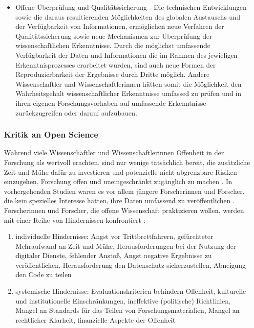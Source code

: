 \begin{itemize}
\item Offene Überprüfung und Qualitätssicherung - Die technischen Entwicklungen sowie die daraus resultierenden Möglichkeiten des globalen Austauschs und der Verfügbarkeit von Informationen, ermöglichen neue Verfahren der Qualitätssicherung sowie neue Mechanismen zur Überprüfung der wissenschaftlichen Erkenntnisse. Durch die möglichst umfassende Verfügbarkeit der Daten und Informationen die im Rahmen des jewieligen Erkenntnisprozesses erarbeitet wurden, sind auch neue Formen der Reproduzierbarkeit der Ergebnisse durch Dritte möglich. Andere Wissenschaftler und Wissenschaftlerinnen hätten somit die Möglichkeit den Wahrheitsgehalt wissenschaftlicher Erkenntnisse umfassed zu prüfen und in ihren eigenen Forschungsvorhaben auf umfassende Erkenntnisse zurückzugreifen oder darauf aufzubauen.
\end{itemize}

\subsubsection{Kritik an Open Science}

Während viele Wissenschaftler und Wissenschaftlerinnen Offenheit in der Forschung als wertvoll erachten, sind nur wenige tatsächlich bereit, die zusätzliche Zeit und Mühe dafür zu investieren und potenzielle nicht abgrenzbare Risiken einzugehen, Forschung offen und uneingeschränkt zugänglich zu machen \cite{Scheliga_2014} \cite{Tenopir_2011} \cite{Procter_2010}. In vorhergehenden Studien waren es vor allem jüngere Forscherinnen und Forscher, die kein spezielles Interesse hatten, ihre Daten umfassend zu veröffentlichen \cite{Tenopir_2011}. Forscherinnen und Forscher, die offene Wissenschaft praktizieren wollen, werden mit einer Reihe von Hindernissen konfrontiert \cite{Scheliga_2014}:
\begin{enumerate}
\item individuelle Hindernisse: Angst vor Trittbrettfahrern, gefürchteter Mehraufwand an Zeit und Mühe, Herausforderungen bei der Nutzung der digitaler Dienste, fehlender Anstoß, Angst negative Ergebnisse zu veröffentlichen, Herausforderung den Datenschutz sicherzustellen, Abneigung den Code zu teilen
\item systemische Hindernisse: Evaluationskriterien behindern Offenheit, kulturelle und institutionelle Einschränkungen, ineffektive (politische) Richtlinien, Mangel an Standards für das Teilen von Forschungsmaterialien, Mangel an rechtlicher Klarheit, finanzielle Aspekte der Offenheit
\end{enumerate}

